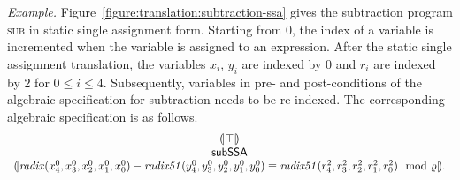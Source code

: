 \noindent
\emph{Example.}
Figure~\ref{figure:translation:subtraction-ssa} gives the subtraction program
\textsc{sub} in static single assignment form. Starting from $0$, the
index of a variable is incremented when the variable is assigned to an
expression. After the static single assignment translation, the
variables ${x}_i$, ${y}_i$ are indexed by $0$ and
${r}_i$ are indexed by $2$ for $0 \leq i \leq 4$. 
Subsequently, variables in pre- and post-conditions of the algebraic
specification for subtraction needs to be re-indexed. The
corresponding algebraic specification is as follows.
\[
\begin{array}{c}
{(\!|}{\top}{|\!)}\\
\mbox{\textsf{subSSA}}\\
{(\!|}{\mathit{radix}({x}^0_4, {x}^0_3, {x}^0_2, {x}^0_1, {x}^0_0) -
\mathit{radix51}({y}^0_4, {y}^0_3, {y}^0_2, {y}^0_1, {y}^0_0)
\equiv
\mathit{radix51}({r}^2_4, {r}^2_3, {r}^2_2, {r}^2_1, {r}^2_0)
\mod {\varrho}
}{|\!)}.
\end{array}
\]

